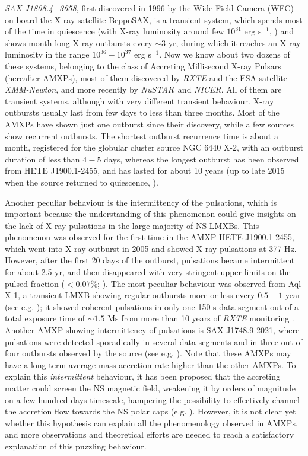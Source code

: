 \documentclass[graybox]{svmult}
\def \xmm {{\em XMM-Newton\xspace}}
\def \rxte {{\em RXTE\xspace}}
\def \saxj{{\em SAX J1808.4$-$3658\xspace}}
\def \nustar{{\em NuSTAR\xspace}}
\def \nicer{{\em NICER\xspace}}
\begin{document}
\saxj, first discovered in 1996 by the Wide Field Camera (WFC) on board the X-ray satellite BeppoSAX, is a transient system, which spends most of the time in quiescence (with X-ray luminosity around few $10^{31}$ erg s$^{-1}$, \cite{Campana2004}) and shows month-long X-ray outbursts every $\sim3$ yr, during which it reaches an X-ray luminosity in the range $10^{36}-10^{37}$ erg s$^{-1}$. Now we know about two dozens of these systems, belonging to the class of Accreting Millisecond X-ray Pulsars (hereafter AMXPs), most of them discovered by \rxte{} and the ESA satellite \xmm{}, and more recently by \nustar\ and \nicer{}.
All of them are transient systems, although with very different transient behaviour. X-ray outbursts usually last from few days to less than three months. Most of the AMXPs have shown just one outburst since their discovery, while a few sources show recurrent outbursts. The shortest outburst recurrence time is about a month, registered for the globular cluster source NGC 6440 X-2, with an outburst duration of less than $4-5$ days, whereas the longest outburst has been observed from HETE J1900.1-2455, and has lasted for about 10 years (up to late 2015 when the source returned to quiescence, \cite{Degenaar2017b}).

Another peculiar behaviour is the intermittency of the pulsations, which is important because the understanding of this phenomenon could give insights on the lack of X-ray pulsations in the large majority of NS LMXBs. This phenomenon was observed for the first time in the AMXP HETE J1900.1-2455, which went into X-ray outburst in 2005 and showed X-ray pulsations at 377 Hz. However, after the first 20 days of the outburst, pulsations became intermittent for about 2.5 yr, and then disappeared with very stringent upper limits on the pulsed fraction ($< 0.07\%$; \cite{Patruno2012a}). The most peculiar behaviour was observed from Aql X-1, a transient LMXB showing regular outbursts more or less every $0.5-1$ year (see e.g. \cite{Campana2013}); it showed coherent pulsations in only one 150-s data segment out of a total exposure time of $\sim1.5$ Ms from more than 10 years of \rxte{} monitoring \cite{Casella2008}. Another AMXP showing intermittency of pulsations is SAX J1748.9-2021, where pulsations were detected sporadically in several data segments and in three out of four outbursts observed by the source (see e.g. \cite{Patruno2009}). Note that these AMXPs may have a long-term average mass accretion rate higher than the other AMXPs. To explain this {\it intermittent} behaviour, it has been proposed that the accreting matter could screen the NS magnetic field, weakening it by orders of magnitude on a few hundred days timescale, hampering the possibility to effectively channel the accretion flow towards the NS polar caps (e.g. \cite{Patruno2012a}). However, it is not clear yet whether this hypothesis can explain all the phenomenology observed in AMXPs, and more observations and theoretical efforts are needed to reach a satisfactory explanation of this puzzling behaviour.
\end{document}
